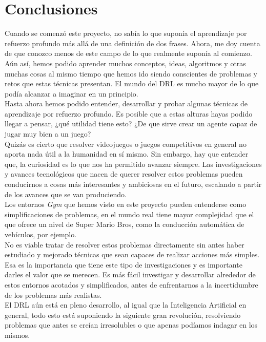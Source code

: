 \documentclass[11pt,fleqn]{book} %
\begin{document}
\section{Conclusiones}

Cuando se comenzó este proyecto, no sabía lo que suponía el aprendizaje por refuerzo profundo más allá de una definición de dos frases. Ahora, me doy cuenta de que conozco menos de este campo de lo que realmente suponía al comienzo. Aún así, hemos podido aprender muchos conceptos, ideas, algoritmos y otras muchas cosas al mismo tiempo que hemos ido siendo conscientes de problemas y retos que estas técnicas presentan. El mundo del DRL es mucho mayor de lo que podía alcanzar a imaginar en un principio. \\

Hasta ahora hemos podido entender, desarrollar y probar algunas técnicas de aprendizaje por refuerzo profundo. Es posible que a estas alturas hayas podido llegar a pensar, ¿qué utilidad tiene esto? ¿De que sirve crear un agente capaz de jugar muy bien a un juego? \\

Quizás es cierto que resolver videojuegos o juegos competitivos en general no aporta nada útil a la humanidad en sí mismo. Sin embargo, hay que entender que, la curiosidad es lo que nos ha permitido avanzar siempre. Las investigaciones y avances tecnológicos que nacen de querer resolver estos problemas pueden conducirnos a cosas más interesantes y ambiciosas en el futuro, escalando a partir de los avances que se van produciendo. \\

Los entornos \textit{Gym} que hemos visto en este proyecto pueden entenderse como simplificaciones de problemas, en el mundo real tiene mayor complejidad que el que ofrece un nivel de Super Mario Bros, como la conducción automática de vehículos, por ejemplo. \\

No es viable tratar de resolver estos problemas directamente sin antes haber estudiado y mejorado técnicas que sean capaces de realizar acciones más simples. Esa es la importancia que tiene este tipo de investigaciones y es importante darles el valor que se merecen. Es más fácil investigar y desarrollar alrededor de estos entornos acotados y simplificados, antes de enfrentarnos a la incertidumbre de los problemas más realistas. \\

El DRL aún está en pleno desarrollo, al igual que la Inteligencia Artificial en general, todo esto está suponiendo la siguiente gran revolución, resolviendo problemas que antes se creían irresolubles o que apenas podíamos indagar en los mismos. 
\end{document}
